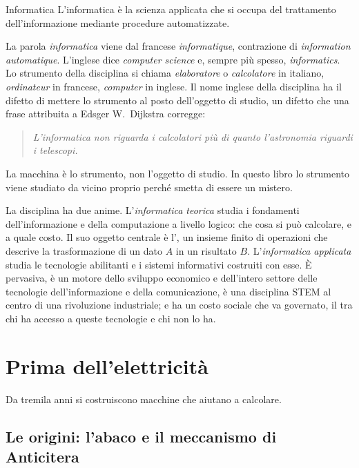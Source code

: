 \begin{definition}{Informatica}
L'informatica è la scienza applicata che si occupa del trattamento
dell'informazione mediante procedure automatizzate.
\end{definition}

La parola \emph{informatica} viene dal francese \emph{informatique},
contrazione di \emph{information automatique}. L'inglese dice \emph{computer
science} e, sempre più spesso, \emph{informatics}. Lo strumento della
disciplina si chiama \emph{elaboratore} o \emph{calcolatore} in italiano,
\emph{ordinateur} in francese, \emph{computer} in inglese. Il nome inglese
della disciplina ha il difetto di mettere lo strumento al posto dell'oggetto di
studio, un difetto che una frase attribuita a Edsger W.\ Dijkstra corregge:

\begin{quote}\itshape
L'informatica non riguarda i calcolatori più di quanto l'astronomia riguardi i
telescopi.
\end{quote}

La macchina è lo strumento, non l'oggetto di studio. In questo libro lo
strumento viene studiato da vicino proprio perché smetta di essere un mistero.

La disciplina ha due anime. L'\emph{informatica teorica} studia i fondamenti
dell'informazione e della computazione a livello logico: che cosa si può
calcolare, e a quale costo. Il suo oggetto centrale è l', un
insieme finito di operazioni che descrive la trasformazione di un dato $A$ in
un risultato $B$. L'\emph{informatica applicata} studia le tecnologie
abilitanti e i sistemi informativi costruiti con esse. È pervasiva, è un motore
dello sviluppo economico e dell'intero settore delle tecnologie
dell'informazione e della comunicazione, è una disciplina STEM al centro di una
rivoluzione industriale; e ha un costo sociale che va governato, il
 tra chi ha accesso a queste tecnologie e chi non lo ha.

\section{Prima dell'elettricità}

Da tremila anni si costruiscono macchine che aiutano a calcolare.

\subsection{Le origini: l'abaco e il meccanismo di Anticitera}

